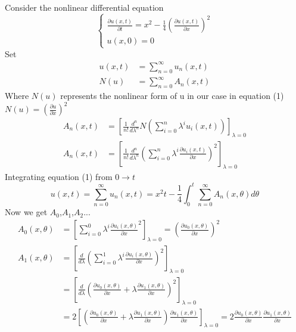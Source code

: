 \setcounter{equation}{0}
\begin{example}
    Consider the nonlinear differential equation
    \begin{equation}
        \begin{cases}
            \displaystyle \frac{\partial u(x,t)}{\partial t} = x^2 - \frac{1}{4}(\frac{\partial u(x,t)}{\partial x})^2
            \\
            \displaystyle u(x,0) = 0
        \end{cases}
    \end{equation}
    Set
    \begin{align*}
        u(x,t) & = \sum_{n=0}^{\infty} u_n(x,t)
        \\
        N(u)   & = \sum_{n=0}^{\infty} A_n(x,t)
    \end{align*}
    Where $N(u)$ represents the nonlinear form of u in our case in equation (1) $N(u) = \left(\frac{\partial u}{\partial x}\right)^2$
    \begin{align*}
        A_n(x,t) & = \left[\frac{1}{n!} \frac{d^n}{d \lambda^n} N\left(\sum_{i=0}^{n}  \lambda^i u_i(x,t)\right)\right]_{\lambda = 0}
        \\
        A_n(x,t) & = \left[\frac{1}{n!} \frac{d^n}{d \lambda^n} \left(\sum_{i=0}^{n}  \lambda^i \frac{\partial u_i(x,t)}{\partial x}\right)^2\right]_{\lambda = 0}
    \end{align*}
    Integrating equation (1) from $0 \to t$
    \[
        u(x,t) = \sum_{n=0}^{\infty} u_n(x,t)  = x^2t - \frac{1}{4} \int_{0}^{t}\sum_{n=0}^{\infty} A_n(x,\theta) d\theta
    \]
    Now we get $A_0$,$A_1$,$A_2$...
    \begin{align*}
        A_0(x,\theta) & = \left[\sum_{i=0}^{0}  \lambda^i \frac{\partial u_i(x,\theta)}{\partial x}^2\right]_{\lambda = 0} = \left(\frac{\partial u_0(x,\theta)}{\partial x}\right)^2
        \\
        A_1(x,\theta) & = \left[\frac{d}{d \lambda} \left(\sum_{i=0}^{1}  \lambda^i \frac{\partial u_i(x,\theta)}{\partial x}\right)^2\right]_{\lambda = 0}
        \\
                      & = \left[\frac{d}{d \lambda} \left(\frac{\partial u_0(x,\theta)}{\partial x} + \lambda \frac{\partial u_1(x,\theta)}{\partial x}\right)^2\right]_{\lambda = 0}
        \\
                      & =2\left[\left(\frac{\partial u_0(x,\theta)}{\partial x} + \lambda \frac{\partial u_1(x,\theta)}{\partial x}\right)\frac{\partial u_1(x,\theta)}{\partial x}\right]_{\lambda = 0} = 2\frac{\partial u_0(x,\theta)}{\partial x} \frac{\partial u_1(x,\theta)}{\partial x}

\end{align*}
\end{example}
